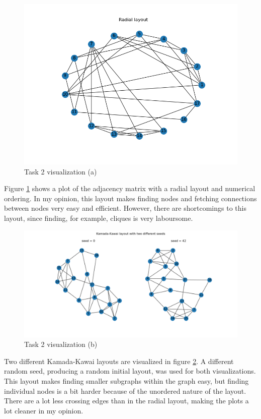 \documentclass[11pt,a4paper,titlepage]{article}
\begin{document}
\newpage

\begin{figure}[h!]
    \centering
    \includegraphics[width=0.8\linewidth]{reports/assignment-4/imgs/radial.png}
    \caption{Task 2 visualization (a)}
    \label{fig:rad}
\end{figure}

Figure \ref{fig:rad} shows a plot of the adjacency matrix with a radial layout and numerical ordering. In my opinion, this layout makes finding nodes and fetching connections between nodes very easy and efficient. However, there are shortcomings to this layout, since finding, for example, cliques is very laboursome.

\begin{figure}[h!]
    \centering
    \includegraphics[width=1.0\linewidth]{reports/assignment-4/imgs/kk.png}
    \caption{Task 2 visualization (b)}
    \label{fig:kk}
\end{figure}

Two different Kamada-Kawai layouts are visualized in figure \ref{fig:kk}. A different random seed, producing a random initial layout, was used for both visualizations. This layout makes finding smaller subgraphs within the graph easy, but finding individual nodes is a bit harder because of the unordered nature of the layout. There are a lot less crossing edges than in the radial layout, making the plots a lot cleaner in my opinion.
\end{document}
